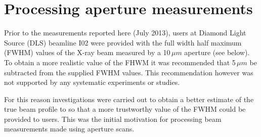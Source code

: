 \section{Processing aperture measurements}
\label{sec:Processing aperture measurements}
Prior to the measurements reported here (July 2013), users at Diamond Light Source (DLS) beamline I02 were provided with the full width half maximum (FWHM) values of the X-ray beam measured by a 10$\,\mu m$ aperture (see below).
To obtain a more realistic value of the FHWM it was recommended that 5$\,\mu m$ be subtracted from the supplied FWHM values.
This recommendation however was not supported by any systematic experiments or studies.

For this reason investigations were carried out to obtain a better estimate of the true beam profile to so that a more trustworthy value of the FWHM could be provided to users.
This was the initial motivation for processing beam measurements made using aperture scans.

